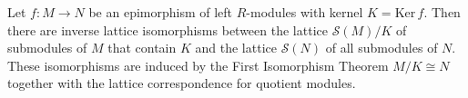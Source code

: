 Let $f: M \to N$ be an epimorphism of left $R$-modules with kernel $K = \text{Ker}\, f$. Then there are inverse lattice isomorphisms between the lattice $\mathcal{S}(M)/K$ of submodules of $M$ that contain $K$ and the lattice $\mathcal{S}(N)$ of all submodules of $N$. These isomorphisms are induced by the First Isomorphism Theorem $M/K \cong N$ together with the lattice correspondence for quotient modules.
